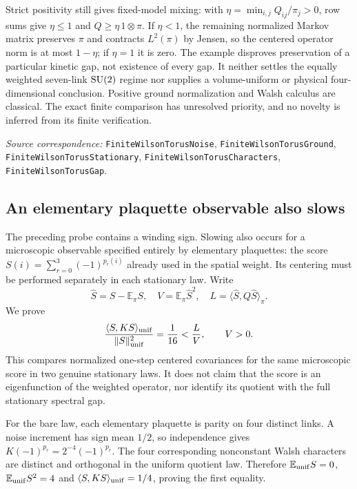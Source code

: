 \documentclass[11pt]{article}
\newcommand{\code}[1]{{\small\nolinkurl{#1}}}
\begin{document}
Strict positivity still gives fixed-model mixing: with $\eta=\min_{i,j}Q_{ij}/\pi_j>0$, row sums give $\eta\leq1$ and $Q\geq\eta\,1\otimes\pi$. If $\eta<1$, the remaining normalized Markov matrix preserves $\pi$ and contracts $L^2(\pi)$ by Jensen, so the centered operator norm is at most $1-\eta$; if $\eta=1$ it is zero.
The example disproves preservation of a particular kinetic gap, not
existence of every gap. It neither settles the equally weighted
seven-link $\mathrm{SU}(2)$ regime nor supplies a volume-uniform or physical
four-dimensional conclusion. Positive ground normalization and Walsh
calculus are classical. The exact finite comparison has unresolved
priority, and no novelty is inferred from its finite verification.
\par\smallskip\begingroup\small\raggedright
\textit{Source correspondence:} \code{FiniteWilsonTorusNoise},
\code{FiniteWilsonTorusGround}, \code{FiniteWilsonTorusStationary},
\code{FiniteWilsonTorusCharacters}, \code{FiniteWilsonTorusGap}.
\par\endgroup


\subsection*{An elementary plaquette observable also slows}
The preceding probe contains a winding sign. Slowing also occurs for
a microscopic observable specified entirely by elementary plaquettes:
the score $S(i)=\sum_{r=0}^3(-1)^{p_r(i)}$ already used in the
spatial weight. Its centering must be performed separately in each
stationary law. Write
\[
 \widehat S=S-\mathbb E_\pi S,
 \quad V=\mathbb E_\pi\widehat S^2,
 \quad L=\langle\widehat S,Q\widehat S\rangle_\pi.
\]
We prove
\begin{equation}\label{eq:plaquetteslowing}
 \frac{\langle S,KS\rangle_{\rm unif}}{\|S\|_{\rm unif}^2}
 =\frac1{16}<\frac{L}{V},\qquad V>0.
\end{equation}
This compares normalized one-step centered covariances for the same
microscopic score in two genuine stationary laws. It does not claim
that the score is an eigenfunction of the weighted operator, nor
identify its quotient with the full stationary spectral gap.

For the bare law, each elementary plaquette is parity on four distinct
links. A noise increment has sign mean $1/2$, so independence gives
$K(-1)^{p_r}=2^{-4}(-1)^{p_r}$. The four corresponding nonconstant
Walsh characters are distinct and orthogonal in the uniform quotient
law. Therefore $\mathbb E_{\rm unif}S=0$,
$\mathbb E_{\rm unif}S^2=4$ and
$\langle S,KS\rangle_{\rm unif}=1/4$, proving the first equality.
\end{document}
